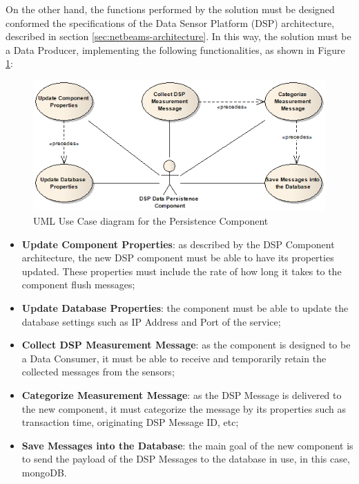 On the other hand, the functions performed by the solution must be designed
conformed the specifications of the Data Sensor Platform (DSP) architecture,
described in section \ref{sec:netbeams-architecture}. In this way, the
solution must be a Data Producer, implementing the following functionalities,
as shown in Figure \ref{fig:DSP-Data-Persistence-UseCases-Diagram-System}:

\begin{figure}[!b]
  \centering
  \includegraphics[scale=0.5]{../diagrams/DSP-Data-Persistence-UseCases-Diagram-System}
  \caption{UML Use Case diagram for the Persistence Component}
  \label{fig:DSP-Data-Persistence-UseCases-Diagram-System}
\end{figure}

\begin{itemize}
  \item \textbf{Update Component Properties}: as described by the DSP Component
  architecture, the new DSP component must be able to have its properties
  updated. These properties must include the rate of how long it takes to the
  component flush messages;
  \item \textbf{Update Database Properties}: the component must be able to
  update the database settings such as IP Address and Port of the service;
  \item \textbf{Collect DSP Measurement Message}: as the component is designed
  to be a Data Consumer, it must be able to receive and temporarily retain the
  collected messages from the sensors;
  \item \textbf{Categorize Measurement Message}: as the DSP Message is
  delivered to the new component, it must categorize the message by its
  properties such as transaction time, originating DSP Message ID, etc;
  \item \textbf{Save Messages into the Database}: the main goal of the new
  component is to send the payload of the DSP Messages to the database in use,
  in this case, mongoDB.
\end{itemize}

